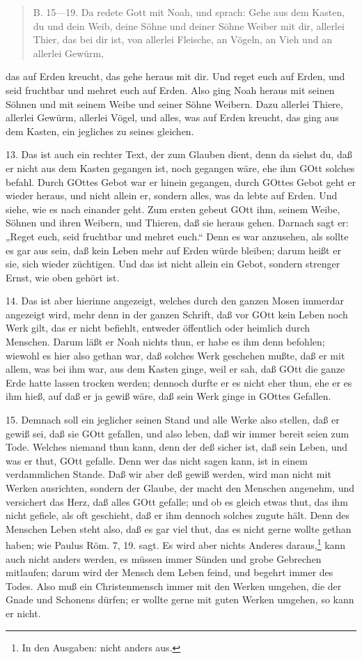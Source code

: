\begin{quote}
B. 15—19. Da redete Gott mit Noah, und sprach: Gehe aus dem Kasten, du und dein Weib, deine Söhne und deiner Söhne Weiber mit dir, allerlei Thier, das bei dir ist, von allerlei Fleische, an Vögeln, an Vieh und an allerlei Gewürm,
\end{quote}
das auf Erden kreucht, das gehe heraus mit dir. Und reget euch auf Erden, und seid fruchtbar und mehret euch auf Erden. Also ging Noah heraus mit seinen Söhnen und mit seinem Weibe und seiner Söhne Weibern. Dazu allerlei Thiere, allerlei Gewürm, allerlei Vögel, und alles, was auf Erden kreucht, das ging aus dem Kasten, ein jegliches zu seines gleichen.

13. Das ist auch ein rechter Text, der zum Glauben dient, denn da siehst du, daß er nicht aus dem Kasten gegangen ist, noch gegangen wäre, ehe ihm GOtt solches befahl. Durch GOttes Gebot war er hinein gegangen, durch GOttes Gebot geht er wieder heraus, und nicht allein er, sondern alles, was da lebte auf Erden. Und siehe, wie es nach einander geht. Zum ersten gebeut GOtt ihm, seinem Weibe, Söhnen und ihren Weibern, und Thieren, daß sie heraus gehen. Darnach sagt er: „Reget euch, seid fruchtbar und mehret euch.“ Denn es war anzusehen, als sollte es gar aus sein, daß kein Leben mehr auf Erden würde bleiben; darum heißt er sie, sich wieder züchtigen. Und das ist nicht allein ein Gebot, sondern strenger Ernst, wie oben gehört ist.

14. Das ist aber hierinne angezeigt, welches durch den ganzen Mosen immerdar angezeigt wird, mehr denn in der ganzen Schrift, daß vor GOtt kein Leben noch Werk gilt, das er nicht befiehlt, entweder öffentlich oder heimlich durch Menschen. Darum läßt er Noah nichts thun, er habe es ihm denn befohlen; wiewohl es hier also gethan war, daß solches Werk geschehen mußte, daß er mit allem, was bei ihm war, aus dem Kasten ginge, weil er sah, daß GOtt die ganze Erde hatte lassen trocken werden; dennoch durfte er es nicht eher thun, ehe er es ihm hieß, auf daß er ja gewiß wäre, daß sein Werk ginge in GOttes Gefallen.

15. Demnach soll ein jeglicher seinen Stand und alle Werke also stellen, daß er gewiß sei, daß sie GOtt gefallen, und also leben, daß wir immer bereit seien zum Tode. Welches niemand thun kann, denn der deß sicher ist, daß sein Leben, und was er thut, GOtt gefalle. Denn wer das nicht sagen kann, ist in einem verdammlichen Stande. Daß wir aber deß gewiß werden, wird man nicht mit Werken ausrichten, sondern der Glaube, der macht den Menschen angenehm, und versichert das Herz, daß alles GOtt gefalle; und ob es gleich etwas thut, das ihm nicht gefiele, als oft geschieht, daß er ihm dennoch solches zugute hält. Denn des Menschen Leben steht also, daß es gar viel thut, das es nicht gerne wollte gethan haben; wie Paulus Röm. 7, 19. sagt. Es wird aber nichts Anderes daraus,\footnote{In den Ausgaben: nicht anders aus.} kann auch nicht anders werden, es müssen immer Sünden und grobe Gebrechen mitlaufen; darum wird der Mensch dem Leben feind, und begehrt immer des Todes. Also muß ein Christenmensch immer mit den Werken umgehen, die der Gnade und Schonens dürfen; er wollte gerne mit guten Werken umgehen, so kann er nicht.

